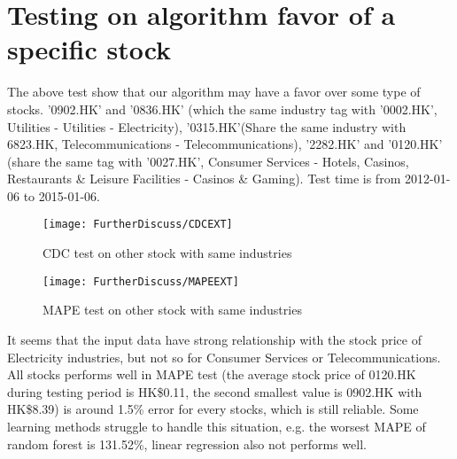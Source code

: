\section{Testing on algorithm favor of a specific stock}
The above test show that our algorithm may have a favor over some type of stocks. '0902.HK' and '0836.HK' (which the same industry tag with '0002.HK', Utilities - Utilities - Electricity), '0315.HK'(Share the same industry with 6823.HK, Telecommunications - Telecommunications), '2282.HK' and '0120.HK' (share the same tag with '0027.HK', Consumer Services - Hotels, Casinos, Restaurants \& Leisure Facilities - Casinos \& Gaming). Test time is from 2012-01-06 to 2015-01-06.

\begin{figure}[h]
	\centering
	\texttt{[image: FurtherDiscuss/CDCEXT]}
	\caption{CDC test on other stock with same industries}
	\label{fg:furtherCDCEXT}
\end{figure}

\begin{figure}[t]
	\centering
	\texttt{[image: FurtherDiscuss/MAPEEXT]}
	\caption{MAPE test on other stock with same industries}
	\label{fg:furtherMAPEEXT}
\end{figure}


It seems that the input data have strong relationship with the stock price of Electricity industries, but not so for Consumer Services or Telecommunications. All stocks performs well in MAPE test (the average stock price of 0120.HK during testing period is HK\$0.11, the second smallest value is 0902.HK with HK\$8.39) is around 1.5\% error for every stocks, which is still reliable. Some learning methods struggle to handle this situation, e.g. the worsest MAPE of random forest is 131.52\%, linear regression also not performs well.